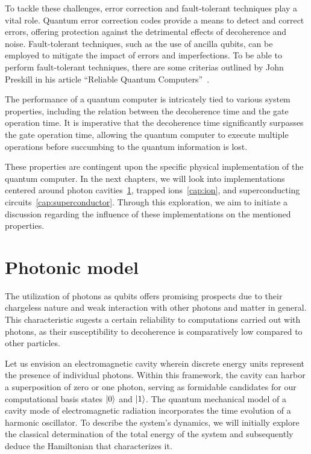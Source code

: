 \documentclass[
  journal=largetwo,
  year=2023,
]{cup-journal}
\begin{document}
To tackle these challenges, error correction and fault-tolerant techniques play a vital role. Quantum error correction codes provide a means to detect and correct errors, offering protection against the detrimental effects of decoherence and noise. Fault-tolerant techniques, such as the use of ancilla qubits, can be employed to mitigate the impact of errors and imperfections. To be able to perform fault-tolerant techniques, there are some criterias outlined by John Preskill in his article ``Reliable Quantum Computers''~\autocite{preskill_1998_reliable}.

The performance of a quantum computer is intricately tied to various system properties, including the relation between the decoherence time and the gate operation time. It is imperative that the decoherence time significantly surpasses the gate operation time, allowing the quantum computer to execute multiple operations before succumbing to the quantum information is lost.

These properties are contingent upon the specific physical implementation of the quantum computer. In the next chapters, we will look into implementations centered around photon cavities~\ref{cap:photonic}, trapped ions~\ref{cap:ion}, and superconducting circuits~\ref{cap:superconductor}. Through this exploration, we aim to initiate a discussion regarding the influence of these implementations on the mentioned properties.


\section{Photonic model}
\label{cap:photonic}
The utilization of photons as qubits offers promising prospects due to their chargeless nature and weak interaction with other photons and matter in general. This characteristic sugests a certain reliability to computations carried out with photons, as their susceptibility to decoherence is comparatively low compared to other particles.

Let us envision an electromagnetic cavity wherein discrete energy units represent the presence of individual photons. Within this framework, the cavity can harbor a superposition of zero or one photon, serving as formidable candidates for our computational basis states \(\ket{0}\) and \(\ket{1}\). The quantum mechanical model of a cavity mode of electromagnetic radiation incorporates the time evolution of a harmonic oscillator. To describe the system's dynamics, we will initially explore the classical determination of the total energy of the system and subsequently deduce the Hamiltonian that characterizes it.
\end{document}
